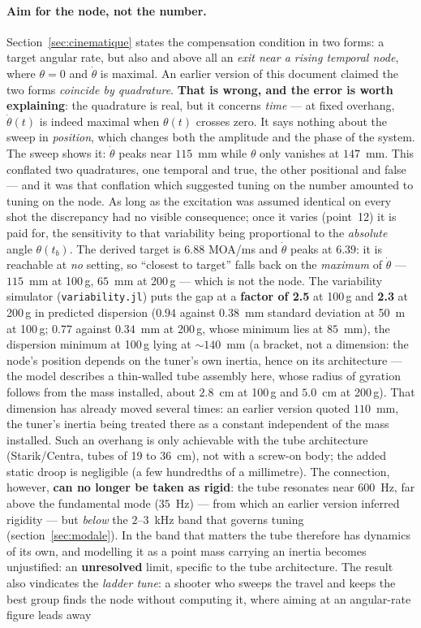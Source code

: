 \documentclass[12pt,a4paper]{article}
\begin{document}
	\paragraph{Aim for the node, not the number.} Section~\ref{sec:cinematique} states the compensation condition in two forms: a target angular rate, but also and above all an \emph{exit near a rising temporal node}, where $\theta = 0$ and $\dot\theta$ is maximal. An earlier version of this document claimed the two forms \emph{coincide by quadrature}. \textbf{That is wrong, and the error is worth explaining}: the quadrature is real, but it concerns \emph{time} --- at fixed overhang, $\dot\theta(t)$ is indeed maximal when $\theta(t)$ crosses zero. It says nothing about the sweep in \emph{position}, which changes both the amplitude and the phase of the system. The sweep shows it: $\dot\theta$ peaks near $115$~mm while $\theta$ only vanishes at $147$~mm. This conflated two quadratures, one temporal and true, the other positional and false --- and it was that conflation which suggested tuning on the number amounted to tuning on the node. As long as the excitation was assumed identical on every shot the discrepancy had no visible consequence; once it varies (point~12) it is paid for, the sensitivity to that variability being proportional to the \emph{absolute} angle $\theta(t_b)$. The derived target is $6.88$ MOA/ms and $\dot\theta$ peaks at $6.39$: it is reachable at \emph{no} setting, so ``closest to target'' falls back on the \emph{maximum} of $\dot\theta$ --- $115$~mm at 100\,g, $65$~mm at 200\,g --- which is not the node. The variability simulator (\texttt{variability.jl}) puts the gap at a \textbf{factor of 2.5} at 100\,g and \textbf{2.3} at 200\,g in predicted dispersion ($0.94$ against $0.38$~mm standard deviation at 50~m at 100\,g; $0.77$ against $0.34$~mm at 200\,g, whose minimum lies at $85$~mm), the dispersion minimum at 100\,g lying at $\sim 140$~mm (a bracket, not a dimension: the node's position depends on the tuner's own inertia, hence on its architecture --- the model describes a thin-walled tube assembly here, whose radius of gyration follows from the mass installed, about $2.8$~cm at 100\,g and $5.0$~cm at 200\,g). That dimension has already moved several times: an earlier version quoted $110$~mm, the tuner's inertia being treated there as a constant independent of the mass installed. Such an overhang is only achievable with the tube architecture (Starik/Centra, tubes of 19 to 36~cm), not with a screw-on body; the added static droop is negligible (a few hundredths of a millimetre). The connection, however, \textbf{can no longer be taken as rigid}: the tube resonates near $600$~Hz, far above the fundamental mode ($35$~Hz) --- from which an earlier version inferred rigidity --- but \emph{below} the $2$--$3$~kHz band that governs tuning (section~\ref{sec:modale}). In the band that matters the tube therefore has dynamics of its own, and modelling it as a point mass carrying an inertia becomes unjustified: an \textbf{unresolved} limit, specific to the tube architecture. The result also vindicates the \emph{ladder tune}: a shooter who sweeps the travel and keeps the best group finds the node without computing it, where aiming at an angular-rate figure leads away 
\end{document}
